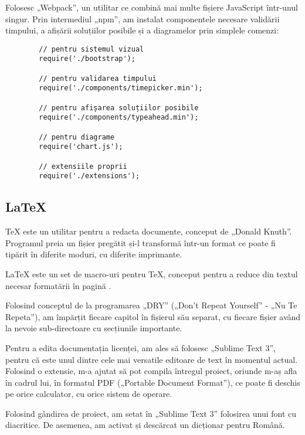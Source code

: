 		Folosesc „Webpack”, un utilitar ce combină mai multe fișiere JavaScript într-unul singur.
		Prin intermediul „npm”, am instalat componentele necesare validării timpului, a afișării soluțiilor posibile și a diagramelor prin simplele comenzi:
		\begin{verbatim}
		// pentru sistemul vizual
		require('./bootstrap');

		// pentru validarea timpului
		require('./components/timepicker.min');

		// pentru afișarea soluțiilor posibile
		require('./components/typeahead.min');

		// pentru diagrame
		require('chart.js');

		// extensiile proprii
		require('./extensions');
		\end{verbatim}

	\subsection{LaTeX}

	TeX este un utilitar pentru a redacta documente, conceput de „Donald Knuth”.
	Programul preia un fișier pregătit și-l transformă într-un format ce poate fi tipărit în diferite moduri, cu diferite imprimante.

	LaTeX este un set de macro-uri pentru TeX, conceput pentru a reduce din textul necesar formatării în pagină \cite{latex}.

	Folosind conceptul de la programarea „DRY” („Don't Repeat Yourself” - „Nu Te Repeta”), am împărțit fiecare capitol în fișierul său separat, cu fiecare fișier având la nevoie sub-directoare cu secțiunile importante.

	Pentru a edita documentația licenței, am ales să folosesc „Sublime Text 3”, pentru că este unul dintre cele mai versatile editoare de text în momentul actual.
	Folosind o extensie, m-a  ajutat să pot compila întregul proiect, oriunde m-aș afla în cadrul lui, în formatul PDF („Portable Document Format”), ce poate fi deschis pe orice calculator, cu orice sistem de operare.

	Folosind gândirea de proiect, am setat în „Sublime Text 3” folosirea unui font cu diacritice.
	De asemenea, am activat și descărcat un dicționar pentru Română.
